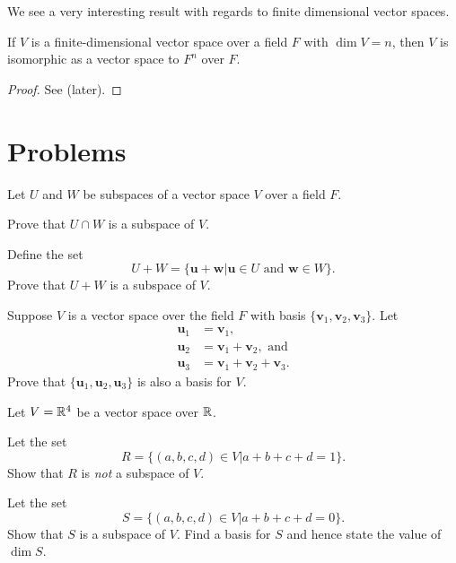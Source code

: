 We see a very interesting result with regards to finite dimensional vector spaces.

\begin{theorem}\label{thrm-vector-space-of-dimension-n-isomorphic-to-F^n}
    If $V$ is a finite-dimensional vector space over a field $F$ with $\dim{V} = n$, then $V$ is isomorphic as a vector space to $F^n$ over $F$.
\end{theorem}
\begin{proof}
    See  (later).
\end{proof}

\newpage

\section{Problems}
\begin{problem}
    Let $U$ and $W$ be subspaces of a vector space $V$ over a field $F$.
    \begin{partquestions}{\alph*}
        \item Prove that $U \cap W$ is a subspace of $V$.
        \item Define the set
        \[
            U + W = \{\textbf{u} + \textbf{w} \vert \textbf{u} \in U \text{ and } \textbf{w} \in W\}.
        \]
        Prove that $U + W$ is a subspace of $V$.
    \end{partquestions}
\end{problem}

\begin{problem}
    Suppose $V$ is a vector space over the field $F$ with basis $\{\textbf{v}_1, \textbf{v}_2, \textbf{v}_3\}$. Let
    \begin{align*}
        \textbf{u}_1 &= \textbf{v}_1,\\
        \textbf{u}_2 &= \textbf{v}_1 + \textbf{v}_2, \text{ and}\\
        \textbf{u}_3 &= \textbf{v}_1 + \textbf{v}_2 + \textbf{v}_3.
    \end{align*}
    Prove that $\{\textbf{u}_1, \textbf{u}_2, \textbf{u}_3\}$ is also a basis for $V$.
\end{problem}

\begin{problem}
    Let $V = \mathbb{R}^4$ be a vector space over $\mathbb{R}$.
    \begin{partquestions}{\alph*}
        \item Let the set
        \[
            R = \{(a, b, c, d) \in V \vert a + b + c + d = 1\}.
        \]
        Show that $R$ is \textit{not} a subspace of $V$.

        \item Let the set
        \[
            S = \{(a, b, c, d) \in V \vert a + b + c + d = 0\}.
        \]
        Show that $S$ is a subspace of $V$. Find a basis for $S$ and hence state the value of $\dim{S}$.
    \end{partquestions}
\end{problem}


